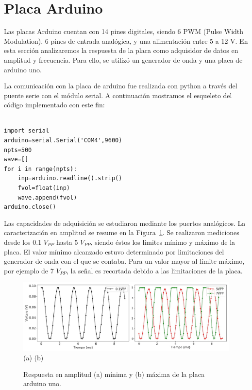 \documentclass[a4paper,10pt]{article}
\begin{document}
\newpage
\section{Placa Arduino}

Las placas Arduino cuentan con 14 pines digitales, siendo 6 PWM (Pulse Width Modulation), 6 pines de entrada analógica, y una alimentación entre 5 a 12 V.
En esta sección analizaremos la respuesta de la placa como adquisidor de datos en amplitud y frecuencia. Para ello, se utilizó un generador de onda y una placa de arduino {\sc uno}. 

La comunicación con la placa de arduino fue realizada con {\sc python} a través del puente serie con el módulo {\sc serial}. A continuación mostramos el esqueleto del código implementado con este fin:
\lstset{language=Python}
\begin{lstlisting}[frame=single]  % Start your code-block

import serial
arduino=serial.Serial('COM4',9600)
npts=500
wave=[]
for i in range(npts):
    inp=arduino.readline().strip()
    fvol=float(inp)
    wave.append(fvol)
arduino.close()
\end{lstlisting}



Las capacidades de adquisición se estudiaron mediante los puertos analógicos. La caracterización en amplitud se resume en la Figura~\ref{fig:amp-arduino}. 
Se realizaron mediciones desde los 0.1 $V_{PP}$ hasta 5 $V_{PP}$, siendo éstos los límites mínimo y máximo de la placa. El valor mínimo alcanzado estuvo determinado por limitaciones del generador de onda con el que se contaba. Para un valor mayor al límite máximo, por ejemplo de 7 $V_{PP}$, la señal es recortada debido a las limitaciones de la placa.
\begin{figure}[H]
  \centering
  \includegraphics[width=\textwidth]{amplitud_arduino.jpg} \\
  (a) \hspace{4cm} (b)
  \caption{Respuesta en amplitud (a) mínima y (b) máxima de la placa arduino {\sc uno}.}
  \label{fig:amp-arduino}
\end{figure}
\end{document}
